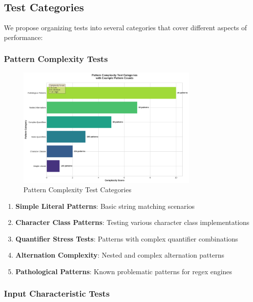 \documentclass[11pt,a4paper]{article}
\begin{document}
\subsection{Test Categories}

We propose organizing tests into several categories that cover different aspects of performance:

\subsubsection{Pattern Complexity Tests}

\begin{figure}[H]
\centering
\includegraphics[width=0.8\textwidth]{illustrations/pattern_complexity_taxonomy.png}
\caption{Pattern Complexity Test Categories}
\label{fig:pattern_complexity}
\end{figure}

\begin{enumerate}
    \item \textbf{Simple Literal Patterns}: Basic string matching scenarios
    \item \textbf{Character Class Patterns}: Testing various character class implementations
    \item \textbf{Quantifier Stress Tests}: Patterns with complex quantifier combinations
    \item \textbf{Alternation Complexity}: Nested and complex alternation patterns
    \item \textbf{Pathological Patterns}: Known problematic patterns for regex engines
\end{enumerate}

\subsubsection{Input Characteristic Tests}
\end{document}
